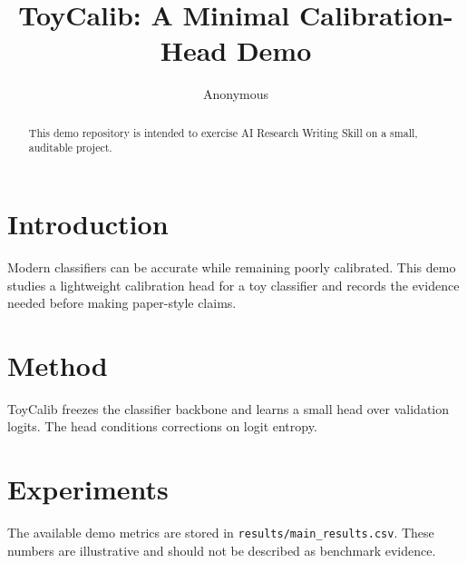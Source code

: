 \documentclass{article}
\title{ToyCalib: A Minimal Calibration-Head Demo}
\author{Anonymous}
\begin{document}
\maketitle

\begin{abstract}
This demo repository is intended to exercise AI Research Writing Skill on a small, auditable project.
\end{abstract}

\section{Introduction}

Modern classifiers can be accurate while remaining poorly calibrated. This demo studies a lightweight calibration head for a toy classifier and records the evidence needed before making paper-style claims.

\section{Method}

ToyCalib freezes the classifier backbone and learns a small head over validation logits. The head conditions corrections on logit entropy.

\section{Experiments}

The available demo metrics are stored in \texttt{results/main_results.csv}. These numbers are illustrative and should not be described as benchmark evidence.
\end{document}
